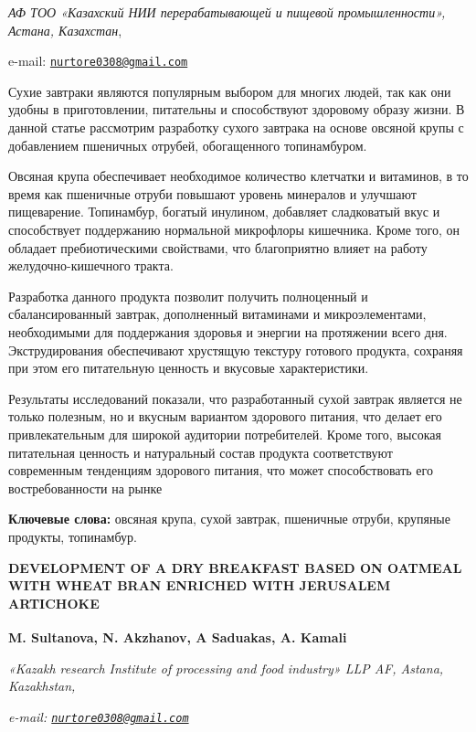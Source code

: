 \begin{affiliation}
\emph{АФ ТОО «Казахский НИИ перерабатывающей и пищевой промышленности», Астана, Казахстан},

e-mail: \href{mailto:nurtore0308@gmail.com}{\nolinkurl{nurtore0308@gmail.com}}
\end{affiliation}

Сухие завтраки являются популярным выбором для многих людей, так как они
удобны в приготовлении, питательны и способствуют здоровому образу
жизни. В данной статье рассмотрим разработку сухого завтрака на основе
овсяной крупы с добавлением пшеничных отрубей, обогащенного
топинамбуром.

Овсяная крупа обеспечивает необходимое количество клетчатки и витаминов,
в то время как пшеничные отруби повышают уровень минералов и улучшают
пищеварение. Топинамбур, богатый инулином, добавляет сладковатый вкус и
способствует поддержанию нормальной микрофлоры кишечника. Кроме того, он
обладает пребиотическими свойствами, что благоприятно влияет на работу
желудочно-кишечного тракта.

Разработка данного продукта позволит получить полноценный и
сбалансированный завтрак, дополненный витаминами и микроэлементами,
необходимыми для поддержания здоровья и энергии на протяжении всего дня.
Экструдирования обеспечивают хрустящую текстуру готового продукта,
сохраняя при этом его питательную ценность и вкусовые характеристики.

Результаты исследований показали, что разработанный сухой завтрак
является не только полезным, но и вкусным вариантом здорового питания,
что делает его привлекательным для широкой аудитории потребителей. Кроме
того, высокая питательная ценность и натуральный состав продукта
соответствуют современным тенденциям здорового питания, что может
способствовать его востребованности на рынке

{\bfseries Ключевые слова:} овсяная крупа, сухой завтрак, пшеничные отруби,
крупяные продукты, топинамбур.

\begin{articleheader}
{\bfseries DEVELOPMENT OF A DRY BREAKFAST BASED ON OATMEAL WITH WHEAT BRAN ENRICHED WITH JERUSALEM ARTICHOKE}

{\bfseries
M. Sultanova,
N. Akzhanov\textsuperscript{\envelope },
A Saduakas,
A. Kamali}
\end{articleheader}

\begin{affiliation}
\emph{«Kazakh research Institute of processing and food industry» LLP AF, Astana, Kazakhstan,}

\emph{e-mail: \href{mailto:nurtore0308@gmail.com}{\nolinkurl{nurtore0308@gmail.com}}}
\end{affiliation}

